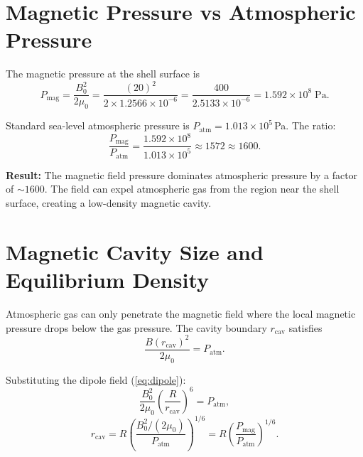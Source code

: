\documentclass[12pt,a4paper]{article}
\begin{document}
\section{Magnetic Pressure vs Atmospheric Pressure}
\label{sec:pressure}

The magnetic pressure at the shell surface is
\begin{equation}
  P_{\text{mag}} = \frac{B_0^2}{2\mu_0}
    = \frac{(20)^2}{2 \times 1.2566 \times 10^{-6}}
    = \frac{400}{2.5133 \times 10^{-6}}
    = 1.592 \times 10^{8} \; \text{Pa}.
\end{equation}

Standard sea-level atmospheric pressure is $P_{\text{atm}} = 1.013 \times 10^5$\,Pa.
The ratio:
\begin{equation}
  \boxed{\frac{P_{\text{mag}}}{P_{\text{atm}}} = \frac{1.592 \times 10^8}{1.013 \times 10^5} \approx 1572 \approx 1600.}
\end{equation}

\textbf{Result:} The magnetic field pressure dominates atmospheric pressure by a factor
of $\sim 1600$.  The field can expel atmospheric gas from the region near the shell
surface, creating a low-density magnetic cavity.

\section{Magnetic Cavity Size and Equilibrium Density}
\label{sec:cavity}

Atmospheric gas can only penetrate the magnetic field where the local magnetic pressure
drops below the gas pressure.  The cavity boundary $r_{\text{cav}}$ satisfies
\begin{equation}
  \frac{B(r_{\text{cav}})^2}{2\mu_0} = P_{\text{atm}}.
\end{equation}

Substituting the dipole field (\ref{eq:dipole}):
\begin{equation}
  \frac{B_0^2}{2\mu_0} \left(\frac{R}{r_{\text{cav}}}\right)^6 = P_{\text{atm}},
\end{equation}
\begin{equation}
  r_{\text{cav}} = R \left(\frac{B_0^2/(2\mu_0)}{P_{\text{atm}}}\right)^{1/6}
    = R \left(\frac{P_{\text{mag}}}{P_{\text{atm}}}\right)^{1/6}.
\end{equation}
\end{document}
